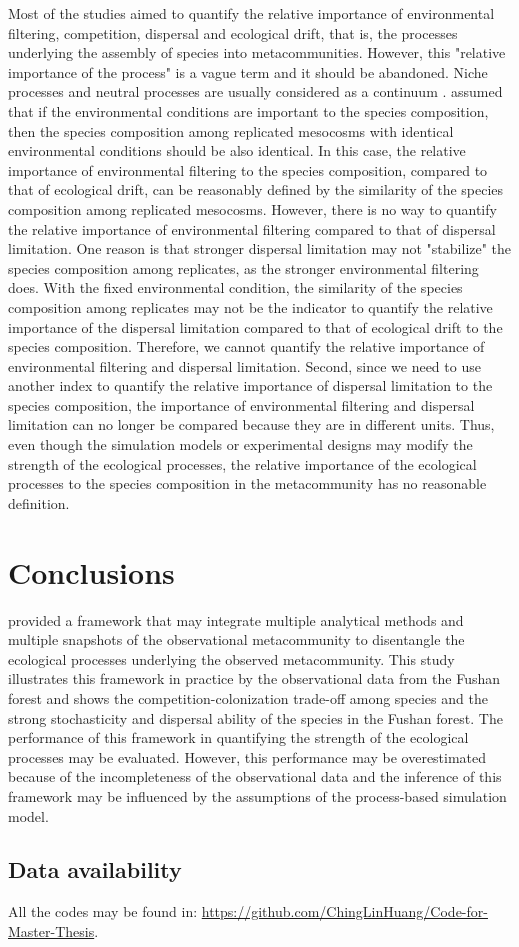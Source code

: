 	Most of the studies aimed to quantify the relative importance of environmental filtering, competition, dispersal and ecological drift, that is, the processes underlying the assembly of species into metacommunities. However, this "relative importance of the process" is a vague term and it should be abandoned. Niche processes and neutral processes are usually considered as a continuum \citep{gravel2006reconciling}. \citet{ron2018dispersal} assumed that if the environmental conditions are important to the species composition, then the species composition among replicated mesocosms with identical environmental conditions should be also identical. In this case, the relative importance of environmental filtering to the species composition, compared to that of ecological drift, can be reasonably defined by the similarity of the species composition among replicated mesocosms. However, there is no way to quantify the relative importance of environmental filtering compared to that of dispersal limitation. One reason is that stronger dispersal limitation may not "stabilize" the species composition among replicates, as the stronger environmental filtering does. With the fixed environmental condition, the similarity of the species composition among replicates may not be the indicator to quantify the relative importance of the dispersal limitation compared to that of ecological drift to the species composition. Therefore, we cannot quantify the relative importance of environmental filtering and dispersal limitation. Second, since we need to use another index to quantify the relative importance of dispersal limitation to the species composition, the importance of environmental filtering and dispersal limitation can no longer be compared because they are in different units. Thus, even though the simulation models or experimental designs may modify the strength of the ecological processes, the relative importance of the ecological processes to the species composition in the metacommunity has no reasonable definition. 
	
	
	
\chapter*{Conclusions}
\setcounter{chapter}{6}
	\noindent
	\citet{guzman2022accounting} provided a framework that may integrate multiple analytical methods and multiple snapshots of the observational metacommunity to disentangle the ecological processes underlying the observed metacommunity. This study illustrates this framework in practice by the observational data from the Fushan forest and shows the competition-colonization trade-off among species and the strong stochasticity and dispersal ability of the species in the Fushan forest. The performance of this framework in quantifying the strength of the ecological processes may be evaluated. However, this performance may be overestimated because of the incompleteness of the observational data and the inference of this framework may be influenced by the assumptions of the process-based simulation model.
	
	
	\section*{Data availability}
	\noindent
	All the codes may be found in: \url{https://github.com/ChingLinHuang/Code-for-Master-Thesis}.
	